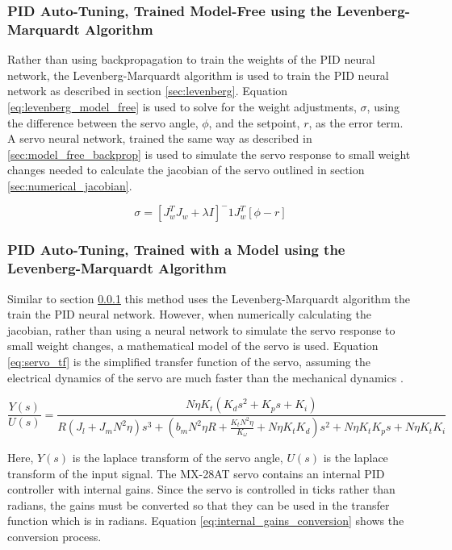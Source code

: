 \documentclass[letterpaper,12pt]{article}
\begin{document}
\subsubsection{PID Auto-Tuning, Trained Model-Free using the Levenberg-Marquardt Algorithm}\label{sec:levenberg_model_free}
Rather than using backpropagation to train the weights of the PID neural network, the Levenberg-Marquardt algorithm is used to train the PID neural network as described in section \ref{sec:levenberg}. Equation \ref{eq:levenberg_model_free} is used to solve for the weight adjustments, $\sigma$, using the difference between the servo angle, $\phi$, and the setpoint, $r$, as the error term. A servo neural network, trained the same way as described in \ref{sec:model_free_backprop} is used to simulate the servo response to small weight changes needed to calculate the jacobian of the servo outlined in section \ref{sec:numerical_jacobian}.

\begin{equation}
	\label{eq:levenberg_model_free}
	\sigma = [J_w^T J_w + \lambda I]^-1 J_w^T [\phi - r]
\end{equation}

\subsubsection{PID Auto-Tuning, Trained with a Model using the Levenberg-Marquardt Algorithm}
Similar to section \ref{sec:levenberg_model_free} this method uses the Levenberg-Marquardt algorithm the train the PID neural network. However, when numerically calculating the jacobian, rather than using a neural network to simulate the servo response to small weight changes, a mathematical model of the servo is used. Equation \ref{eq:servo_tf} is the simplified transfer function of the servo, assuming the electrical dynamics of the servo are much faster than the mechanical dynamics \cite{m.r.o.a.maximo}.


\begin{equation}
	\label{eq:servo_tf}
	\frac{Y(s)}{U(s)} = \frac{N \eta K_t (K_d s^2 + K_p s + K_i)}{R (J_l + J_m N^2 \eta)s^3 + (b_m N^2 \eta R + \frac{K_t N^2 \eta}{K_\omega} + N \eta K_t K_d)s^2 + N \eta K_t K_p s + N \eta K_t K_i}
\end{equation}

Here, $Y(s)$ is the laplace transform of the servo angle, $U(s)$ is the laplace transform of the input signal.
The MX-28AT servo contains an internal PID controller with internal gains. Since the servo is controlled in ticks rather than radians, the gains must be converted so that they can be used in the transfer function which is in radians. Equation \ref{eq:internal_gains_conversion} shows the conversion process.
\end{document}

